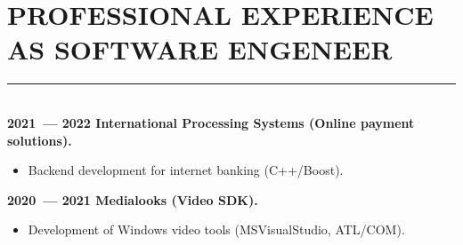 \documentclass[a4paper,oneside,12pt]{article}
\newcommand{\cvpart}[1]{%
\vspace{-1em}%
\section*{\large\bfseries\MakeTextUppercase{#1}}%
\vspace{-1em}%
\rule{\linewidth}{0.3em}\\[-.3em]%
}
\begin{document}


\cvpart{Professional Experience as Software Engeneer}


{\bf
2021~--- 2022 International Processing Systems (Online payment solutions).
}
\begin{itemize}
    \item Backend  development for internet banking (C++/Boost).
\end{itemize}

{\bf
2020~--- 2021 Medialooks (Video SDK).
}
\begin{itemize}
    \item Development of Windows video tools (MSVisualStudio, ATL/COM).
\end{itemize}
\end{document}
